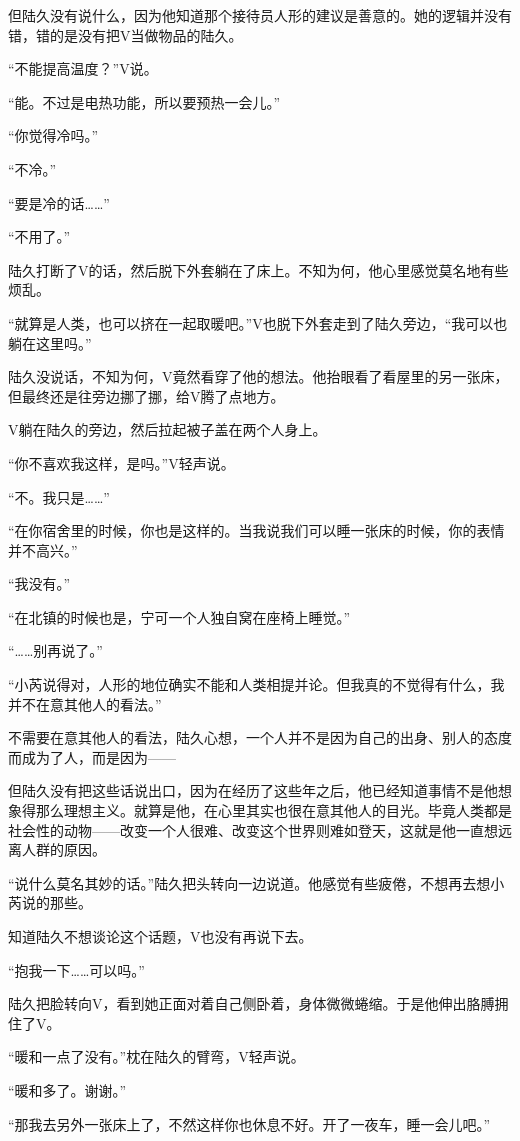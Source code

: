 但陆久没有说什么，因为他知道那个接待员人形的建议是善意的。她的逻辑并没有错，错的是没有把V当做物品的陆久。

“不能提高温度？”V说。

“能。不过是电热功能，所以要预热一会儿。”

“你觉得冷吗。”

“不冷。”

“要是冷的话……”

“不用了。”

陆久打断了V的话，然后脱下外套躺在了床上。不知为何，他心里感觉莫名地有些烦乱。

“就算是人类，也可以挤在一起取暖吧。”V也脱下外套走到了陆久旁边，“我可以也躺在这里吗。”

陆久没说话，不知为何，V竟然看穿了他的想法。他抬眼看了看屋里的另一张床，但最终还是往旁边挪了挪，给V腾了点地方。

V躺在陆久的旁边，然后拉起被子盖在两个人身上。

“你不喜欢我这样，是吗。”V轻声说。

“不。我只是……”

“在你宿舍里的时候，你也是这样的。当我说我们可以睡一张床的时候，你的表情并不高兴。”

“我没有。”

“在北镇的时候也是，宁可一个人独自窝在座椅上睡觉。”

“……别再说了。”

“小芮说得对，人形的地位确实不能和人类相提并论。但我真的不觉得有什么，我并不在意其他人的看法。”

不需要在意其他人的看法，陆久心想，一个人并不是因为自己的出身、别人的态度而成为了人，而是因为——

但陆久没有把这些话说出口，因为在经历了这些年之后，他已经知道事情不是他想象得那么理想主义。就算是他，在心里其实也很在意其他人的目光。毕竟人类都是社会性的动物——改变一个人很难、改变这个世界则难如登天，这就是他一直想远离人群的原因。

“说什么莫名其妙的话。”陆久把头转向一边说道。他感觉有些疲倦，不想再去想小芮说的那些。

知道陆久不想谈论这个话题，V也没有再说下去。

“抱我一下……可以吗。”

陆久把脸转向V，看到她正面对着自己侧卧着，身体微微蜷缩。于是他伸出胳膊拥住了V。

“暖和一点了没有。”枕在陆久的臂弯，V轻声说。

“暖和多了。谢谢。”

“那我去另外一张床上了，不然这样你也休息不好。开了一夜车，睡一会儿吧。”

